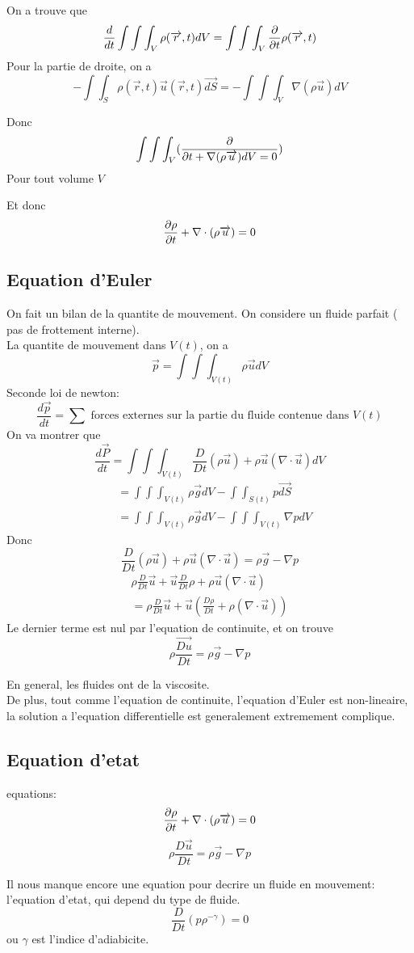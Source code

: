 \documentclass[../main.tex]{subfiles}
\begin{document}
On a trouve que
\[ 
	\frac{d}{dt} \int \int \int _V \rho( \overrightarrow{r},t) dV = \int \int \int_V \frac{\partial}{\partial t}\rho( \overrightarrow{r},t) 
\]
Pour la partie de droite, on a
\[ 
	- \int \int_S \rho( \vec{r},t) \vec{u}( \vec{r},t) \vec{dS} = - \int \int \int_V \nabla ( \rho\vec{u})  dV
\]

Donc
\[ 
	\int \int \int_V( \frac{\partial}{\partial t + \nabla( \rho\overrightarrow{u}) dV =0 }) 
\]
Pour tout volume $V$

Et donc
\[ 
	\frac{\partial \rho}{\partial t}+ \nabla\cdot( \rho \overrightarrow{u}) =0
\]

\subsection{Equation d'Euler}
On fait un bilan de la quantite de mouvement.
On considere un fluide parfait ( pas de frottement interne).\\
La quantite de mouvement dans $V( t) $, on a 
\[ 
	\vec{p} = \int \int \int_{V( t) }  \rho \vec{u} dV
\]
Seconde loi de newton:
\[ 
	\frac{d \vec{p}}{dt}= \sum \text{ forces externes sur la partie du fluide contenue dans  } V( t) 
\]
On va montrer que 
\[ 
	\frac{d \vec{P}}{dt} = \int \int \int_{V( t) }  \frac{D}{Dt}( \rho \vec{u}) + \rho \vec{u}( \nabla \cdot \vec{u}) dV
\]
\begin{align*}
	&= \int \int\int_{V( t) } \rho \vec{g} dV - \int \int_{S( t) }  p \vec{dS}	\\
	&= \int \int\int_{V( t) } \rho \vec{g} dV  - \int \int\int_{V( t) }  \nabla p dV	
\end{align*}
Donc
\[ 
	\frac{D}{Dt}( \rho \vec{u}) + \rho \vec{u} ( \nabla \cdot \vec{u}) = \rho \vec{g} - \nabla p
\]
\begin{align*}
	\rho \frac{D}{Dt}\vec{u} + \vec{u} \frac{D}{Dt}\rho + \rho \vec{u}( \nabla \cdot \vec{u})\\
	= \rho \frac{D}{Dt}\vec{u} + \vec{u} ( \frac{D\rho}{Dt} + \rho ( \nabla \cdot \vec{u}) ) 
\end{align*}
Le dernier terme est nul par l'equation de continuite, et on trouve
\[ 
\rho \frac{\vec{Du}}{Dt} = \rho \vec{g} - \nabla p
\]

\begin{rmq}
En general, les fluides ont de la viscosite.\\
De plus, tout comme l'equation de continuite, l'equation d'Euler est non-lineaire, la solution a l'equation differentielle est generalement extremement complique.
\end{rmq}
\subsection{Equation d'etat}
equations:
\[ 
	\frac{\partial \rho}{\partial t} + \nabla \cdot ( \rho \overrightarrow{u}) =0
\]
\[ 
\rho \frac{D \vec{u}}{Dt}= \rho \vec{g} - \nabla p
\]

Il nous manque encore une equation pour decrire un fluide en mouvement: l'equation d'etat, qui depend du type de fluide.
\[ 
	\frac{D}{Dt}( p\rho^{-\gamma}) =0
\]
ou $\gamma$ est l'indice d'adiabicite.
\end{document}
